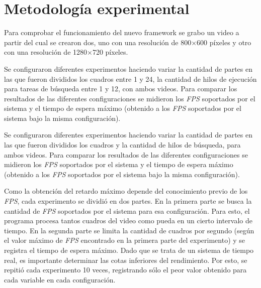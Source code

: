 
\section{Metodología experimental}

\label{metodologiaExperimental}

Para comprobar el funcionamiento del nuevo framework se grabo un video a partir
del cual se crearon dos, uno con una resolución de 800$\times$600 píxeles y otro
con una resolución de 1280$\times$720 píxeles.

Se configuraron diferentes experimentos haciendo variar la cantidad de partes en
las que fueron divididos los cuadros entre 1 y 24, la cantidad de hilos de
ejecución para tareas de búsqueda entre 1 y 12, con ambos videos. Para comparar
los resultados de las diferentes configuraciones se midieron los \emph{FPS}
soportados por el sistema y el tiempo de espera máximo (obtenido a los
\emph{FPS} soportados por el sistema bajo la misma configuración).

Se configuraron diferentes experimentos haciendo variar la cantidad de partes en
las que fueron divididos los cuadros y la cantidad de hilos de búsqueda, para
ambos videos. Para comparar los resultados de las diferentes configuraciones se
midieron los \emph{FPS} soportados por el sistema y el tiempo de espera máximo
(obtenido a los \emph{FPS} soportados por el sistema bajo la misma
configuración).

Como la obtención del retardo máximo depende del conocimiento previo de los
\emph{FPS}, cada experimento se dividió en dos partes. En la primera parte se
busca la cantidad de \emph{FPS} soportados por el sistema para esa
configuración. Para esto, el programa procesa tantos cuadros del video como
pueda en un cierto intervalo de tiempo. En la segunda parte se limita la
cantidad de cuadros por segundo (según el valor máximo de \emph{FPS} encontrado
en la primera parte del experimento) y se registra el tiempo de espera máximo.
Dado que se trata de un sistema de tiempo real, es importante determinar las
cotas inferiores del rendimiento. Por esto, se repitió cada experimento 10
veces, registrando sólo el peor valor obtenido para cada variable en cada
configuración.

